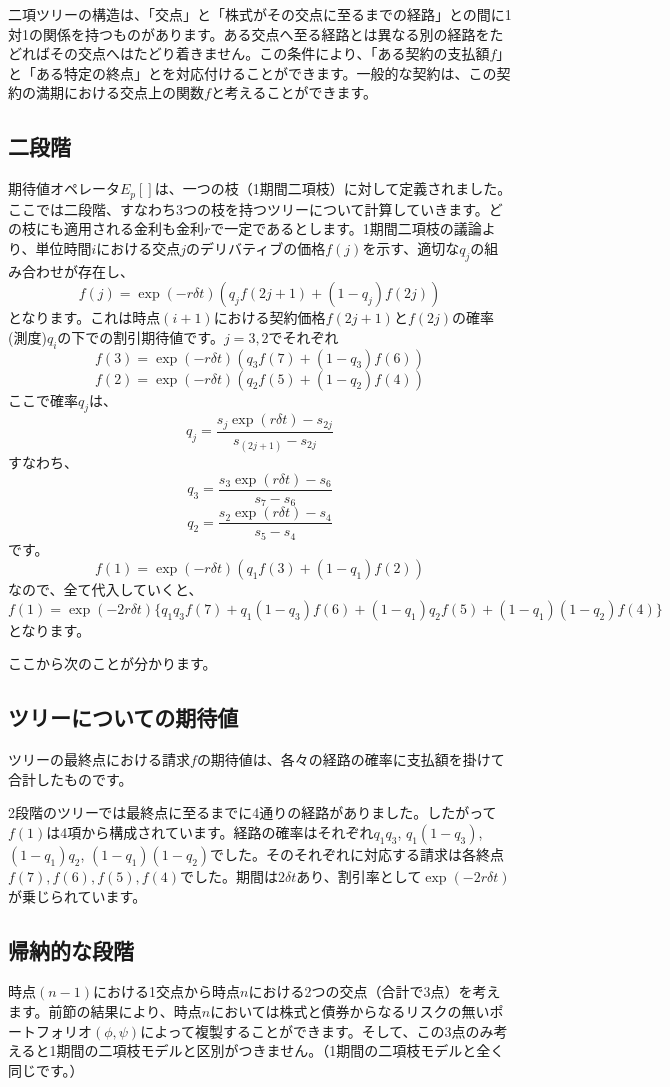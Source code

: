 \documentclass[uplatex,a4j,12pt,dvipdfmx]{jsarticle}
\begin{document}
二項ツリーの構造は、「交点」と「株式がその交点に至るまでの経路」との間に1対1の関係を持つものがあります。ある交点へ至る経路とは異なる別の経路をたどればその交点へはたどり着きません。この条件により、「ある契約の支払額$f$」と「ある特定の終点」とを対応付けることができます。一般的な契約は、この契約の満期における交点上の関数$f$と考えることができます。

\subsection{二段階}
期待値オペレータ$E_p[]$は、一つの枝（1期間二項枝）に対して定義されました。ここでは二段階、すなわち3つの枝を持つツリーについて計算していきます。どの枝にも適用される金利も金利$r$で一定であるとします。1期間二項枝の議論より、単位時間$i$における交点$j$のデリバティブの価格$f(j)$を示す、適切な$q_j$の組み合わせが存在し、
\[f(j) = \exp(-r\delta t) ( q_j f(2j+1) + ( 1 -q_j )f(2j) )\]
となります。これは時点$(i+1)$における契約価格$f(2j+1)$と$f(2j)$の確率(測度)$q_i$の下での割引期待値です。$j=3,2$でそれぞれ
\[f(3) = \exp(-r\delta t) ( q_3 f(7) + ( 1 -q_3 )f(6) )\]
\[f(2) = \exp(-r\delta t) ( q_2 f(5) + ( 1 -q_2 )f(4) )\]
ここで確率$q_j$は、
\[q_j = \frac{s_j \exp(r\delta t) - s_{2j}}{s_{(2j+1)} - s_{2j}}\]
すなわち、
\[q_3 = \frac{s_3 \exp(r\delta t) - s_6}{s_7 - s_6}\]
\[q_2 = \frac{s_2 \exp(r\delta t) - s_4}{s_5 - s_4}\]
です。
\[f(1) = \exp(-r\delta t) ( q_1f(3) + ( 1 -q_1 )f(2) )\]
なので、全て代入していくと、
\[f(1) = \exp(-2r\delta t) \{ q_1 q_3 f(7) + q_1 (1 - q_3) f(6) + (1 - q_1) q_2 f(5) + (1 - q_1) (1 - q_2) f(4) \}\]
となります。

ここから次のことが分かります。
\subsection{ツリーについての期待値}
ツリーの最終点における請求$f$の期待値は、各々の経路の確率に支払額を掛けて合計したものです。

2段階のツリーでは最終点に至るまでに4通りの経路がありました。したがって$f(1)$は4項から構成されています。経路の確率はそれぞれ$q_1 q_3$, $q_1 (1 - q_3)$, $(1 - q_1) q_2$, $(1 - q_1) (1 - q_2)$でした。そのそれぞれに対応する請求は各終点$f(7),f(6),f(5),f(4)$でした。期間は$2\delta t$あり、割引率として$\exp(-2r\delta t)$が乗じられています。

\subsection{帰納的な段階}
時点$(n-1)$における1交点から時点$n$における2つの交点（合計で3点）を考えます。前節の結果により、時点$n$においては株式と債券からなるリスクの無いポートフォリオ$(\phi,\psi)$によって複製することができます。そして、この3点のみ考えると1期間の二項枝モデルと区別がつきません。（1期間の二項枝モデルと全く同じです。）
\end{document}
